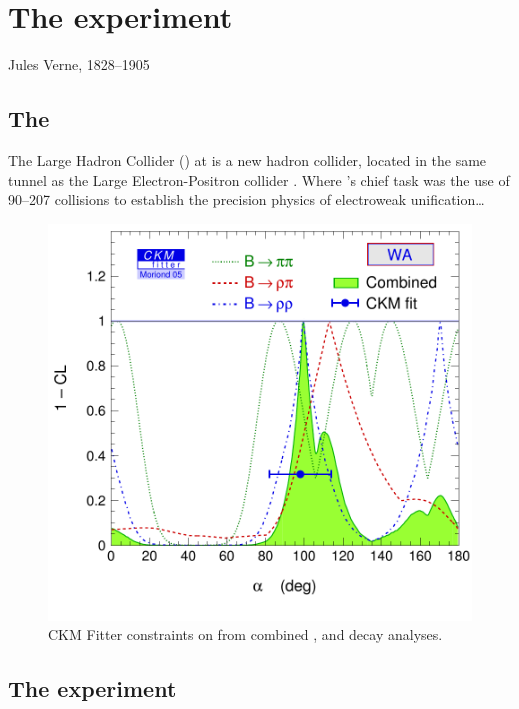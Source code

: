\chapter{The experiment}
\label{chap:MoreStuff}

{Jules Verne, 1828--1905}

\section{The }
The Large Hadron Collider () at  is a new hadron collider,
located in the same tunnel as the Large Electron-Positron collider 
. Where 's chief task was the use 
of  {90--207}{ }  collisions to establish the 
precision physics of electroweak unification\dots

\begin{figure}
  \includegraphics[width=\largefigwidth]{figures/ckmfitter-alpha-combined}
  \caption[CKM Fitter constraints on .]%
  {CKM Fitter constraints on  from combined , 
     and  decay analyses.}
  \label{fig:CKMFitter}
\end{figure}

\section{The experiment}
\label{sec:LHCbInDetail}

